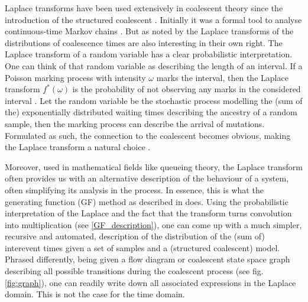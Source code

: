 \documentclass[10pt, a4]{article}
\begin{document}
Laplace transforms have been used extensively in coalescent theory since the introduction of the structured coalescent \citep{Takahata1988, Notohara1990, Barton1995}. Initially it was a formal tool to analyse continuous-time Markov chains \citep{Takahata1988, Griffiths1991, Wilkinson-herbots1998}. But as noted by \citet{Wilkinson-herbots1998} the Laplace transforms of the distributions of coalescence times are also interesting in their own right. The Laplace transform of a random variable has a clear probabilistic interpretation. One can think of that random variable as describing the length of an interval. If a Poisson marking process with intensity $\omega$ marks the interval, then the Laplace transform $f^*(\omega)$ is the probability of not observing any marks in the considered interval \citep{Rade1972}. Let the random variable be the stochastic process modelling the (sum of the) exponentially distributed waiting times describing the ancestry of a random sample, then the marking process can describe the arrival of mutations. Formulated as such, the connection to the coalescent \citep{Kingman1982, Hudson1983, Tajima1983} becomes obvious, making the Laplace transform a natural choice \citep{Weissman2017}.

Moreover, used in mathematical fields like queueing theory, the Laplace transform often provides us with an alternative description of the behaviour of a system, often simplifying its analysis in the process. In essence, this is what the generating function (GF) method as described in \citet{Lohse2011} does. Using the probabilistic interpretation of the Laplace and the fact that the transform turns convolution into multiplication (see \ref{GF_description}), one can come up with a much simpler, recursive and automated, description of the distribution of the (sum of) interevent times given a set of samples and a (structured coalescent) model. Phrased differently, being given a flow diagram or coalescent state space graph describing all possible transitions during the coalescent process (see fig. \ref{fig:graph}), one can readily write down all associated expressions in the Laplace domain. This is not the case for the time domain.\\
\end{document}
